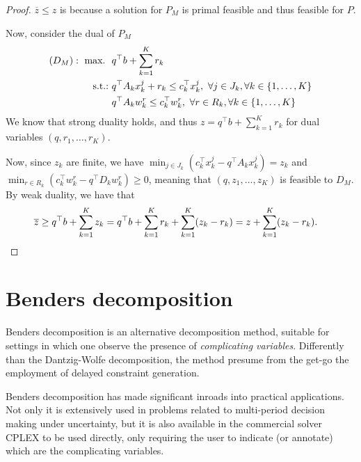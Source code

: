 \begin{proof}
	$\overline{z} \leq z$ is because a solution for $P_M$ is primal feasible and thus feasible for $P$.
	
	Now, consider the dual of $P_M$
	\begin{align*}
		(D_M): ~\mathop{\text{max.~}} \ & q^\top b + \sum_{k=1}^K r_k \\
		\mathop{\text{s.t.:~}} & q^\top A_k x_k^j + r_k \leq c_k^\top x_k^j, \ \forall j \in J_k, \forall k \in \left\{ 1,\dots, K \right \} \\
		& q^\top A_kw_k^r \leq c_k^\top w_k^r, \ \forall r \in R_k, \forall k \in \left\{ 1,\dots, K \right \} \\ 
	\end{align*}
	We know that strong duality holds, and thus $z = q^\top b + \sum_{k=1}^K r_k $ for dual variables $(q, r_1, \dots, r_K)$. 
	
	Now, since $z_k$ are finite, we have $\min_{j \in J_k}(c_k^\top x_k^j - q^\top A_k x_k^j) = z_k$ and $\min_{r \in R_k}(c_k^\top w_k^r - q^\top D_k w_k^r) \geq 0$,
	meaning that $(q, z_1, \dots, z_K)$ is feasible to $D_M$. By weak duality, we have that
	\begin{align*}
		\overline{z} & \geq q^\top b + \sum_{k=1}^K	z_k = q^\top b + \sum_{k=1}^K r_k + \sum_{k=1}^K (z_k - r_k) = z + \sum_{k=1}^K (z_k - r_k). \qedhere	
	\end{align*}
\end{proof}



\section{Benders decomposition}


Benders decomposition is an alternative decomposition method, suitable for settings in which one observe the presence of \emph{complicating variables}. Differently than the Dantzig-Wolfe decomposition, the method presume from the get-go the employment of delayed constraint generation. 

Benders decomposition has made significant inroads into practical applications. Not only it is extensively used in problems related to multi-period decision making under uncertainty, but it is also available in the commercial solver CPLEX to be used directly, only requiring the user to indicate (or annotate) which are the complicating variables. 

